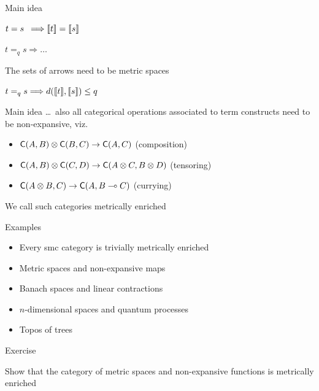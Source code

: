 \documentclass{beamer}
\begin{document}
\begin{frame}{Main idea}

        $t = s \, \, \, \Longrightarrow \llbracket t \rrbracket = \llbracket s \rrbracket$

        \bigskip
        \pause
        $t =_q s \Longrightarrow \dots$

        \bigskip
        \pause
        The sets of arrows need to be \alert{metric spaces}

        \bigskip
        $t =_q s \Longrightarrow d(\llbracket t \rrbracket,\llbracket s \rrbracket) \leq q$
\end{frame}

\begin{frame}{Main idea}
        \dots\ also all categorical operations associated
        to term constructs need to be \alert{non-expansive}, viz.

        \begin{itemize}
                \item $\mathsf{C}(A,B) \otimes \mathsf{C}(B,C) \to \mathsf{C}(A,C)$
                        \hspace{2cm} (composition) 
                \item $\mathsf{C}(A,B) \otimes \mathsf{C}(C,D) \to \mathsf{C}(A \otimes C, B \otimes D)$
                        \hspace{0.57cm} (tensoring) 
                \item $\mathsf{C}(A \otimes B, C) \to \mathsf{C}(A, B \multimap C)$
                        \hspace{2.01cm} (currying) 
        \end{itemize}

        \pause
        \bigskip
        We call such categories \alert{metrically enriched}
\end{frame}

\begin{frame}{Examples}
        \begin{itemize}
                \item Every smc category is \alert{trivially} metrically enriched
                \item Metric spaces and non-expansive maps 
                \item Banach spaces and linear \alert{contractions}
                \item $n$-dimensional spaces and \alert{quantum processes}
                \item Topos of trees
        \end{itemize}
\end{frame}
\begin{frame}{Exercise}

        Show that the category of metric spaces and non-expansive
        functions is metrically enriched
\end{frame}
\end{document}
